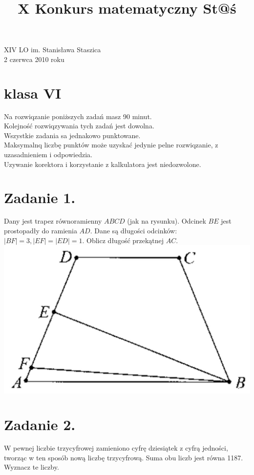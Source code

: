 \documentclass[10pt]{article}
\title{X Konkurs matematyczny St@ś }
\author{}
\date{}
\begin{document}
\maketitle
XIV LO im. Stanisława Staszica\\
2 czerwca 2010 roku

\section*{klasa VI}
Na rozwiqzanie poniższych zadań masz 90 minut.\\
Kolejność rozwiqzywania tych zadań jest dowolna.\\
Wszystkie zadania sa jednakowo punktowane.\\
Maksymalnq liczbę punktów może uzyskać jedynie pelne rozwiqzanie, z uzasadnieniem i odpowiedzia.\\
Uzywanie korektora i korzystanie z kalkulatora jest niedozwolone.

\section*{Zadanie 1.}
Dany jest trapez równoramienny \(A B C D\) (jak na rysunku). Odcinek \(B E\) jest prostopadły do ramienia \(A D\). Dane są długości odcinków: \(|B F|=3,|E F|=|E D|=1\). Oblicz długość przekątnej \(A C\).\\
\includegraphics[max width=\textwidth, center]{2024_11_21_419bcdc1680818eb8347g-1}

\section*{Zadanie 2.}
W pewnej liczbie trzycyfrowej zamieniono cyfrę dziesiątek z cyfrą jedności, tworząc w ten sposób nową liczbę trzycyfrową. Suma obu liczb jest równa 1187. Wyznacz te liczby.
\end{document}
